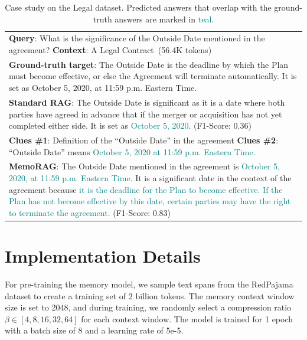 \documentclass[sigconf]{acmart}
\begin{document}
\begin{table}[t]
\small
    \centering
    \caption{Case study on the Legal dataset. Predicted answers that overlap with the ground-truth answers are marked in \textcolor{teal}{teal}.}
    \begin{tabular}{p{.98\linewidth}}
    \toprule
     \textbf{Query}: What is the significance of the Outside Date mentioned in the agreement? \quad \textbf{Context}: A Legal Contract~(56.4K tokens)\\
     \textbf{Ground-truth target}:  The Outside Date is the deadline by which the Plan must become effective, or else the Agreement will terminate automatically. It is set as October 5, 2020, at 11:59 p.m. Eastern Time.\\
\midrule
   \textbf{Standard RAG}: The Outside Date is significant as it is a date where both parties have agreed in advance that if the merger or acquisition has not yet completed either side. It is set as  \textcolor{teal}{October 5, 2020}. (F1-Score: 0.36) \\
\midrule
     \textbf{Clues \#1}: Definition of the ``Outside Date'' in the agreement \quad
     \textbf{Clues \#2}: ``Outside Date'' means \textcolor{teal}{October 5, 2020 at 11:59 p.m. Eastern Time.} \\
     \textbf{MemoRAG}: The Outside Date mentioned in the agreement is  \textcolor{teal}{October 5, 2020, at 11:59 p.m. Eastern Time.} It is a significant date in the context of the agreement because  \textcolor{teal}{it is the deadline for the Plan to become effective. If the Plan has not become effective by this date, certain parties may have the right to terminate the agreement.} (F1-Score: 0.83)\\

    \bottomrule
    \end{tabular}
    \label{tab:case}
    \vspace{-5pt}
\end{table}


\section{Implementation Details}
\label{sec:imp}
For pre-training the memory model, we sample text spans from the RedPajama~\cite{together2023redpajama} dataset to create a training set of 2 billion tokens. The memory context window size is set to 2048, and during training, we randomly select a compression ratio $\beta \in [4, 8, 16, 32, 64]$ for each context window. The model is trained for 1 epoch with a batch size of 8 and a learning rate of 5e-5.
\end{document}
